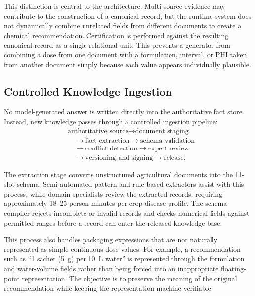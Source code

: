 \documentclass[a4paper,fleqn]{cas-dc}
\begin{document}
This distinction is central to the architecture. Multi-source evidence may contribute to the construction of a canonical record, but the runtime system does not dynamically combine unrelated fields from different documents to create a chemical recommendation. Certification is performed against the resulting canonical record as a single relational unit. This prevents a generator from combining a dose from one document with a formulation, interval, or PHI taken from another document simply because each value appears individually plausible.

\subsection{Controlled Knowledge Ingestion}

No model-generated answer is written directly into the authoritative fact store. Instead, new knowledge passes through a controlled ingestion pipeline:
\begin{equation}
\begin{aligned}
& \text{authoritative source} \rightarrow \text{document staging} \\
& \quad \rightarrow \text{fact extraction} \rightarrow \text{schema validation} \\
& \quad \rightarrow \text{conflict detection} \rightarrow \text{expert review} \\
& \quad \rightarrow \text{versioning and signing} \rightarrow \text{release}.
\end{aligned}
\end{equation}

The extraction stage converts unstructured agricultural documents into the 11-slot schema. Semi-automated pattern and rule-based extractors assist with this process, while domain specialists review the extracted records, requiring approximately 18--25 person-minutes per crop-disease profile. The schema compiler rejects incomplete or invalid records and checks numerical fields against permitted ranges before a record can enter the released knowledge base.

This process also handles packaging expressions that are not naturally represented as simple continuous dose values. For example, a recommendation such as ``1 sachet (5~g) per 10~L water'' is represented through the formulation and water-volume fields rather than being forced into an inappropriate floating-point representation. The objective is to preserve the meaning of the original recommendation while keeping the representation machine-verifiable.
\end{document}
